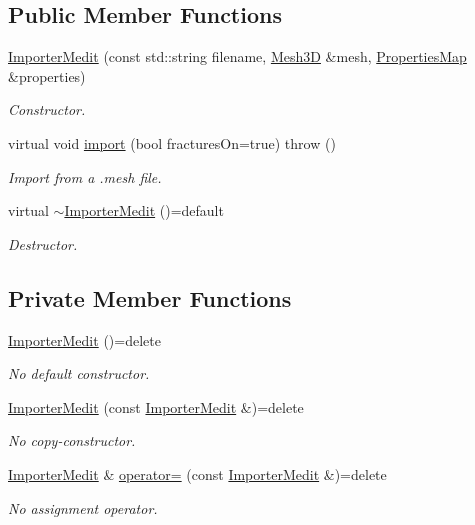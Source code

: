 \subsection*{Public Member Functions}
\begin{DoxyCompactItemize}
\item 
\hyperlink{classFVCode3D_1_1ImporterMedit_ad9e9f6db2229ccc96a93cf8e8cd8c42e}{Importer\+Medit} (const std\+::string filename, \hyperlink{classFVCode3D_1_1Mesh3D}{Mesh3D} \&mesh, \hyperlink{classFVCode3D_1_1PropertiesMap}{Properties\+Map} \&properties)
\begin{DoxyCompactList}\small\item\em Constructor. \end{DoxyCompactList}\item 
virtual void \hyperlink{classFVCode3D_1_1ImporterMedit_a588447299960ebaf2f7583fe2ddecdcc}{import} (bool fractures\+On=true)  throw ()
\begin{DoxyCompactList}\small\item\em Import from a .mesh file. \end{DoxyCompactList}\item 
virtual \hyperlink{classFVCode3D_1_1ImporterMedit_afb8cd52d29e9500a52e485a8b7ae9f32}{$\sim$\+Importer\+Medit} ()=default
\begin{DoxyCompactList}\small\item\em Destructor. \end{DoxyCompactList}\end{DoxyCompactItemize}
\subsection*{Private Member Functions}
\begin{DoxyCompactItemize}
\item 
\hyperlink{classFVCode3D_1_1ImporterMedit_a08f4ccf787f7901b650ea2c10c90a3cb}{Importer\+Medit} ()=delete
\begin{DoxyCompactList}\small\item\em No default constructor. \end{DoxyCompactList}\item 
\hyperlink{classFVCode3D_1_1ImporterMedit_abc63cf8b7ea4f9c0783edd7fddc71ebe}{Importer\+Medit} (const \hyperlink{classFVCode3D_1_1ImporterMedit}{Importer\+Medit} \&)=delete
\begin{DoxyCompactList}\small\item\em No copy-\/constructor. \end{DoxyCompactList}\item 
\hyperlink{classFVCode3D_1_1ImporterMedit}{Importer\+Medit} \& \hyperlink{classFVCode3D_1_1ImporterMedit_af62c6871262d52a4eec85215b6dc348d}{operator=} (const \hyperlink{classFVCode3D_1_1ImporterMedit}{Importer\+Medit} \&)=delete
\begin{DoxyCompactList}\small\item\em No assignment operator. \end{DoxyCompactList}\end{DoxyCompactItemize}
